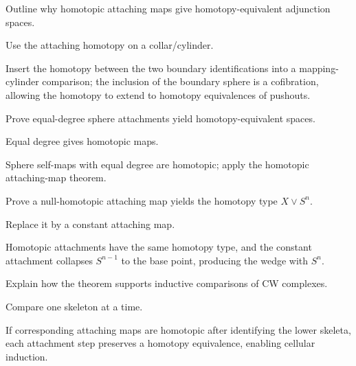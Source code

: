 \begin{exercise}\label{exr:viii08-ped-06}
Outline why homotopic attaching maps give homotopy-equivalent adjunction spaces.
\end{exercise}
\begin{hint}
Use the attaching homotopy on a collar/cylinder.
\end{hint}
\begin{solution}
Insert the homotopy between the two boundary identifications into a mapping-cylinder comparison; the inclusion of the boundary sphere is a cofibration, allowing the homotopy to extend to homotopy equivalences of pushouts.
\end{solution}

\begin{exercise}\label{exr:viii08-ped-07}
Prove equal-degree sphere attachments yield homotopy-equivalent spaces.
\end{exercise}
\begin{hint}
Equal degree gives homotopic maps.
\end{hint}
\begin{solution}
Sphere self-maps with equal degree are homotopic; apply the homotopic attaching-map theorem.
\end{solution}

\begin{exercise}\label{exr:viii08-ped-08}
Prove a null-homotopic attaching map yields the homotopy type $X\vee S^n$.
\end{exercise}
\begin{hint}
Replace it by a constant attaching map.
\end{hint}
\begin{solution}
Homotopic attachments have the same homotopy type, and the constant attachment collapses $S^{n-1}$ to the base point, producing the wedge with $S^n$.
\end{solution}

\begin{exercise}\label{exr:viii08-ped-09}
Explain how the theorem supports inductive comparisons of CW complexes.
\end{exercise}
\begin{hint}
Compare one skeleton at a time.
\end{hint}
\begin{solution}
If corresponding attaching maps are homotopic after identifying the lower skeleta, each attachment step preserves a homotopy equivalence, enabling cellular induction.
\end{solution}


